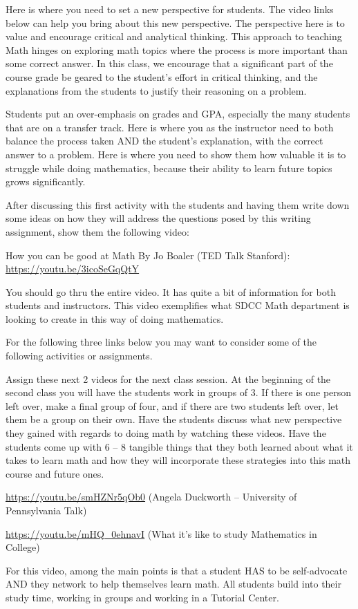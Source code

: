 \documentclass{article}
\begin{document}
\begin{notes}
  Here is where you need to set a new perspective for students.  The video links below can help you bring about this new perspective.  The perspective here is to value and encourage critical and analytical thinking.  This approach to teaching Math hinges on exploring math topics where the process is more important than some correct answer.  In this class, we encourage that a significant part of the course grade be geared to the student’s effort in critical thinking, and the explanations from the students to justify their reasoning on a problem.  

Students put an over-emphasis on grades and GPA, especially the many students that are on a transfer track.   Here is where you as the instructor need to both balance the process taken AND the student’s explanation, with the correct answer to a problem.  Here is where you need to show them how valuable it is to struggle while doing mathematics, because their ability to learn future topics grows significantly.  

After discussing this first activity with the students and having them write down some ideas on how they will address the questions posed by this writing assignment, show them the following video:

How you can be good at Math By Jo Boaler (TED Talk Stanford): \url{https://youtu.be/3icoSeGqQtY}

You should go thru the entire video. It has quite a bit of information for both students and instructors.  This video exemplifies what SDCC Math department is looking to create in this way of doing mathematics.
\end{notes}

\begin{notes}
  For the following three links below you may want to consider some of the following activities or assignments.  

Assign these next 2 videos for the next class session.  At the beginning of the second class you will have the students work in groups of 3. If there is one person left over, make a final group of four, and if there are two students left over, let them be a group on their own.  Have the students discuss what new perspective they gained with regards to doing math by watching these videos.  Have the students come up with 6 – 8 tangible things that they both learned about what it takes to learn math and how they will incorporate these strategies into this math course and future ones.

\url{https://youtu.be/smHZNr5qOb0} (Angela Duckworth – University of Pennsylvania Talk) 

\vspace{0.25in}

\url{https://youtu.be/mHQ_0ehnavI} (What it’s like to study Mathematics in College) 

For this video, among the main points is that a student HAS to be self-advocate AND they network to help themselves learn math.  All students build into their study time, working in groups and working in a Tutorial Center.
\end{notes}
\end{document}
